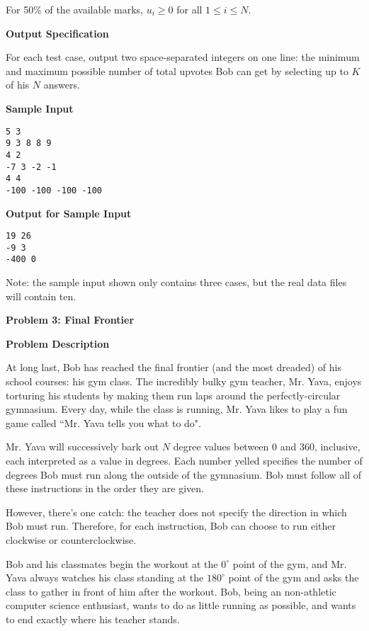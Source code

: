 \documentclass[11pt]{article}
\newcommand{\problem}[2]{\textbf{\Large Problem #1: #2} \vspace{0.4em}}
\newcommand{\heading}[1]{\vspace{0.6em} \textbf{#1}}
\begin{document}
For 50\% of the available marks, $u_i \ge 0$ for all $1 \le i \le N$.


\heading{Output Specification}

For each test case, output two space-separated integers on one line: the minimum and maximum possible number of total upvotes Bob can get by selecting up to $K$ of his $N$ answers.


\heading{Sample Input}
\vspace{-\topsep}
\begin{verbatim}
5 3
9 3 8 8 9
4 2
-7 3 -2 -1
4 4
-100 -100 -100 -100
\end{verbatim}

\heading{Output for Sample Input}
\vspace{-\topsep}
\begin{verbatim}
19 26
-9 3
-400 0
\end{verbatim}

Note: the sample input shown only contains three cases, but the real data files will contain ten.


\pagebreak




\problem{3}{Final Frontier}


\heading{Problem Description}

At long last, Bob has reached the final frontier (and the most dreaded) of his school courses: his gym class. The incredibly bulky gym teacher, Mr. Yava, enjoys torturing his students by making them run laps around the perfectly-circular gymnasium. Every day, while the class is running, Mr. Yava likes to play a fun game called ``Mr. Yava tells you what to do".

Mr. Yava will successively bark out $N$ degree values between 0 and 360, inclusive, each interpreted as a value in degrees. Each number yelled specifies the number of degrees Bob must run along the outside of the gymnasium. Bob must follow all of these instructions in the order they are given.

However, there's one catch: the teacher does not specify the direction in which Bob must run. Therefore, for each instruction, Bob can choose to run either clockwise or counterclockwise.

Bob and his classmates begin the workout at the $0^{\circ}$ point of the gym, and Mr. Yava always watches his class standing at the $180^{\circ}$ point of the gym and asks the class to gather in front of him after the workout. Bob, being an non-athletic computer science enthusiast, wants to do as little running as possible, and wants to end exactly where his teacher stands.
\end{document}
